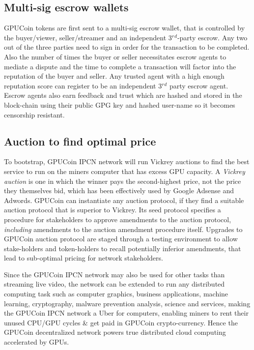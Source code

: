 \documentclass{article}
\begin{document}
\subsection{Multi-sig escrow wallets}
GPUCoin tokens are first sent to a multi-sig escrow wallet, that is controlled by the buyer/viewer, seller/streamer and an independent 3$^r$$^d$-party escrow. Any two out of the three parties need to sign in order for the transaction to be completed. Also the number of times the buyer or seller necessitates escrow agents to mediate a dispute and the time to complete a transaction will factor into the reputation of the buyer and seller. Any trusted agent with a high enough reputation score can register to be an independent 3$^r$$^d$ party escrow agent. Escrow agents also earn feedback and trust which are hashed and stored in the block-chain using their public GPG key and hashed user-name so it becomes censorship resistant.


\subsection{Auction to find optimal price}
To bootstrap, GPUCoin IPCN network will run Vickrey auctions to find the best service to run on the miners computer that has excess GPU capacity. A \emph{Vickrey auction} is one in which the winner pays the second-highest price, not the price they themselves bid, which has been effectively used by Google Adsense and Adwords.
GPUCoin can instantiate any auction protocol, if they find a suitable auction protocol that is superior to Vickrey. Its seed protocol specifies a procedure for stakeholders to approve amendments to the auction protocol, \emph{including} amendments to the auction amendment procedure itself. Upgrades to GPUCoin auction protocol are staged through a testing environment to allow stake-holders and token-holders to recall potentially inferior amendments, that lead to sub-optimal pricing for network stakeholders. 

Since the GPUCoin IPCN network may also be used for other tasks than streaming live video, the network can be extended to run any distributed computing task such as computer graphics, business applications, machine learning, cryptography, malware prevention analysis, science and services, making the GPUCoin IPCN network a Uber for computers, enabling miners to rent their unused CPU/GPU cycles \& get paid in GPUCoin crypto-currency. Hence the GPUCoin decentralized network powers true distributed cloud computing accelerated by GPUs.
\end{document}
